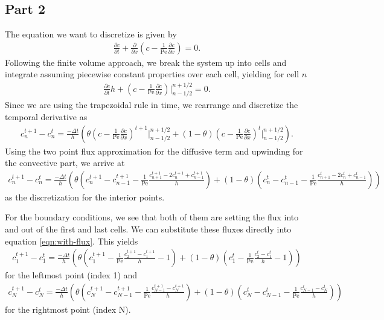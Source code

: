 \documentclass{article}
\begin{document}
\subsection{Part 2}
The equation we want to discretize is given by
\begin{align}
    \frac{\partial c}{\partial t} + \frac{\partial}{\partial x} \left(c - \frac{1}{\mathrm{Pe}} \frac{\partial c}{\partial x} \right) = 0.
\end{align}
Following the finite volume approach, we break the system up into cells and integrate assuming piecewise constant properties over each cell, yielding for cell $n$
\begin{align}
    \frac{\partial c}{\partial t} h  + \left( c - \frac{1}{\mathrm{Pe}} \frac{\partial c}{\partial x} \right)\biggr\rvert^{n+1/2}_{n-1/2}  = 0.
\end{align}
Since we are using the trapezoidal rule in time, we rearrange and discretize the temporal derivative as
\begin{align}
c^{t+1}_{n} - c^{t}_{n} = \frac{-\Delta t}{h}\left( \theta \left(c - \frac{1}{\mathrm{Pe}} \frac{\partial c}{\partial x} \right)^{t+1}\biggr\rvert^{n+1/2}_{n-1/2} + (1 - \theta) \left(c - \frac{1}{\mathrm{Pe}} \frac{\partial c}{\partial x} \right)^{t}\biggr\rvert^{n+1/2}_{n-1/2} \right).
\label{eqn:with-flux}
\end{align}
Using the two point flux approximation for the diffusive term and upwinding for the convective part, we arrive at
\begin{align}
c^{t+1}_{n} - c^{t}_{n} = \frac{-\Delta t}{h}\left( \theta \left(c^{t+1}_n - c^{t+1}_{n-1} - \frac{1}{\mathrm{Pe}} \frac{c^{t+1}_{n+1} - 2c^{t+1}_{n} + c^{t+1}_{n-1}}{h} \right) + (1 - \theta) \left(c^t_{n} - c^{t}_{n-1} - \frac{1}{\mathrm{Pe}} \frac{c^{t}_{n+1} - 2c^{t}_{n} + c^{t}_{n-1}}{h} \right) \right)
\end{align}
as the discretization for the interior points.

For the boundary conditions, we see that both of them are setting the flux into and out of the first and last cells.
We can substitute these fluxes directly into equation \eqref{eqn:with-flux}.
This yields
\begin{align}
c^{t+1}_{1} - c^{t}_{1} = \frac{-\Delta t}{h}\left( \theta \left(c^{t+1}_{1} - \frac{1}{\mathrm{Pe}} \frac{c^{t+1}_{2} - c^{t+1}_{1}}{h} - 1 \right) + (1 - \theta) \left( c^{t}_{1} - \frac{1}{\mathrm{Pe}} \frac{c^{t}_{2} - c^{t}_{1}}{h} - 1 \right) \right)
\end{align}
for the leftmost point (index 1)  and
\begin{align}
c^{t+1}_{N} - c^{t}_{N} = \frac{-\Delta t}{h}\left( \theta \left(c^{t+1}_{N} - c^{t+1}_{N-1} - \frac{1}{\mathrm{Pe}} \frac{c^{t+1}_{N-1} - c^{t+1}_{N}}{h} \right) + (1 - \theta) \left( c^{t}_{N} - c^{t}_{N-1} - \frac{1}{\mathrm{Pe}} \frac{c^{t}_{N-1} - c^{t}_{N}}{h} \right) \right)
\end{align}
for the rightmost point (index N).
\end{document}
